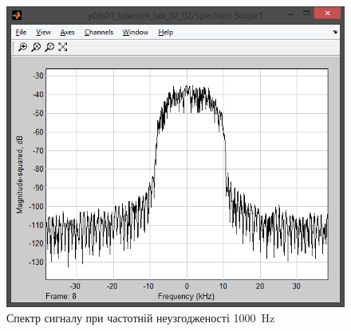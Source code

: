 \documentclass[
	a4paper,
	oneside,
	BCOR = 10mm,
	DIV = 12,
	12pt,
	headings = normal,
]{scrartcl}
\begin{document}
\begin{figure}[!htbp]
\begin{minipage}[t]{0.5\textwidth - 0.5em}
						\includegraphics[height = 8\baselineskip]{../01-solution/02-freqshift-1000-hz-channel-spectrum.png}
						\caption{Спектр сигналу при частотній неузгодженості \SI{1000}{\hertz}}
						\label{fig:freqshift-scope}
					\end{minipage}%
				\end{figure}
\end{document}
